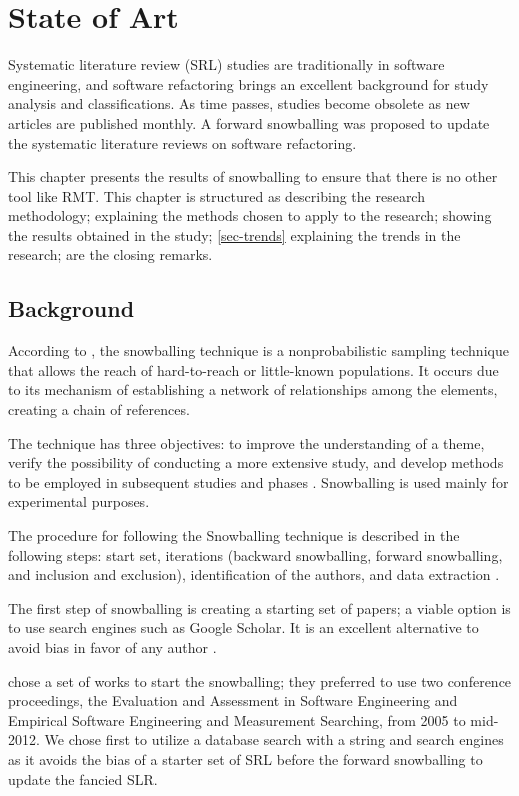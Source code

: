 \chapter{State of Art}%
\label{chap-state}

Systematic literature review (SRL) studies are traditionally in software engineering, and software refactoring brings an excellent background for study analysis and classifications. As time passes, studies become obsolete as new articles are published monthly. A forward snowballing was proposed to update the systematic literature reviews on software refactoring.

This chapter presents the results of snowballing to ensure that there is no other tool like RMT. This chapter is structured as  describing the research methodology;  explaining the methods chosen to apply to the research;  showing the results obtained in the study; \cref{sec-trends} explaining the trends in the research;  are the closing remarks.

\section{Background}
\label{sec-background}
According to \cite{bernard2006}, the snowballing technique is a nonprobabilistic sampling technique that allows the reach of hard-to-reach or little-known populations. It occurs due to its mechanism of establishing a network of relationships among the elements, creating a chain of references.

The technique has three objectives: to improve the understanding of a theme, verify the possibility of conducting a more extensive study, and develop methods to be employed in subsequent studies and phases \cite{vinuto2014}. Snowballing is used mainly for experimental purposes.

The procedure for following the Snowballing technique is described in the following steps: start set, iterations (backward snowballing, forward snowballing, and inclusion and exclusion), identification of the authors, and data extraction \cite{Wohlin2014}.

The first step of snowballing is creating a starting set of papers; a viable option is to use search engines such as Google Scholar. It is an excellent alternative to avoid bias in favor of any author \cite{Wohlin2014}.

\textcite{Kitchenham2013} chose a set of works to start the snowballing; they preferred to use two conference proceedings, the Evaluation and Assessment in Software Engineering and Empirical Software Engineering and Measurement Searching, from 2005 to mid-2012. We chose first to utilize a database search with a string and search engines as it avoids the bias of a starter set of SRL before the forward snowballing to update the fancied SLR.

